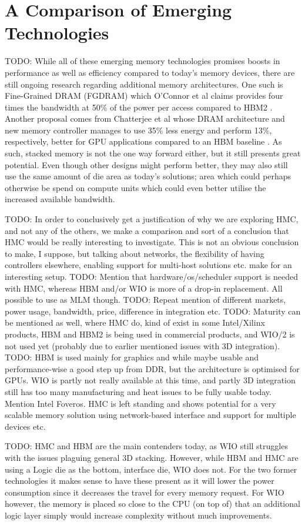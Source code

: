 \section{A Comparison of Emerging Technologies}
TODO: While all of these emerging memory technologies promises boosts in performance as well as efficiency compared to today's memory devices, there are still ongoing research regarding additional memory architectures. One such is Fine-Grained DRAM (FGDRAM) which O'Connor et al claims provides four times the bandwidth at 50\% of the power per access compared to HBM2 \cite{O'Connor:2017:FDE:3123939.3124545}. Another proposal comes from Chatterjee et al whose DRAM architecture and new memory controller manages to use 35\% less energy and perform 13\%, respectively, better for GPU applications compared to an HBM baseline \cite{7920815}. As such, stacked memory is not the one way forward either, but it still presents great potential. Even though other designs might perform better, they may also still use the same amount of die area as today's solutions; area which could perhaps otherwise be spend on compute units which could even better utilise the increased available bandwidth.

TODO: In order to conclusively get a justification of why we are exploring HMC, and not any of the others, we make a comparison and sort of a conclusion that HMC would be really interesting to investigate. This is not an obvious conclusion to make, I suppose, but talking about networks, the flexibility of having controllers elsewhere, enabling support for multi-host solutions etc. make for an interesting setup. 
TODO: Mention that hardware/os/scheduler support is needed with HMC, whereas HBM and/or WIO is more of a drop-in replacement. All possible to use as MLM though.
TODO: Repeat mention of different markets, power usage, bandwidth, price, difference in integration etc. 
TODO: Maturity can be mentioned as well, where HMC do, kind of exist in some Intel/Xilinx products, HBM and HBM2 is being used in commercial products, and WIO/2 is not used yet (probably due to earlier mentioned issues with 3D integration).
TODO: HBM is used mainly for graphics and while maybe usable and performance-wise a good step up from DDR, but the architecture is optimised for GPUs. WIO is partly not really available at this time, and partly 3D integration still has too many manufacturing and heat issues to be fully usable today. Mention Intel Foveros. HMC is left standing and shows potential for a very scalable memory solution using network-based interface and support for multiple devices etc. 

TODO: HMC and HBM are the main contenders today, as WIO still struggles with the issues plaguing general 3D stacking. However, while HBM and HMC are using a Logic die as the bottom, interface die, WIO does not. For the two former technologies it makes sense to have these present as it will lower the power consumption since it decreases the travel for every memory request. For WIO however, the memory is placed so close to the CPU (on top of) that an additional logic layer simply would increase complexity without much improvements.